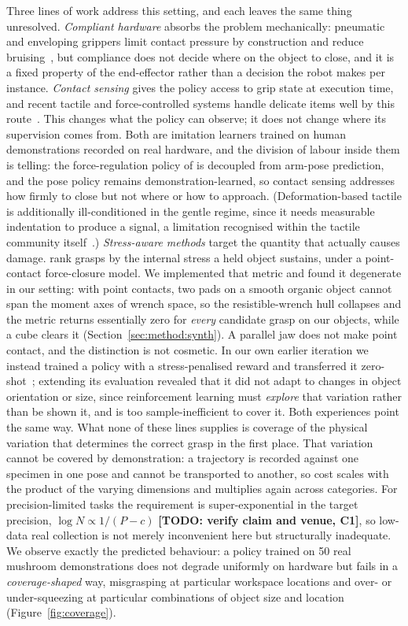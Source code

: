 Three lines of work address this setting, and each leaves the same thing unresolved.
\emph{Compliant hardware} absorbs the problem mechanically: pneumatic and enveloping grippers
limit contact pressure by construction and reduce bruising~\citep{wang2024softgripper}, but
compliance does not decide where on the object to close, and it is a fixed property of the
end-effector rather than a decision the robot makes per instance. \emph{Contact sensing} gives
the policy access to grip state at execution time, and recent tactile and force-controlled
systems handle delicate items well by this route~\citep{tfgripper,vtam}. This changes what the
policy can observe; it does not change where its supervision comes from. Both are imitation
learners trained on human demonstrations recorded on real hardware, and the division of labour
inside them is telling: the force-regulation policy of \citet{tfgripper} is decoupled from
arm-pose prediction, and the pose policy remains demonstration-learned, so contact sensing
addresses how firmly to close but not where or how to approach. (Deformation-based tactile is
additionally ill-conditioned in the gentle regime, since it needs measurable indentation to
produce a signal, a limitation recognised within the tactile community
itself~\citep{lighttact}.) \emph{Stress-aware methods} target the quantity that actually causes
damage. \citet{pan2020stressmin} rank grasps by the internal stress a held object sustains,
under a point-contact force-closure model. We implemented that metric and found it degenerate
in our setting: with point contacts, two pads on a smooth organic object cannot span the
moment axes of wrench space, so the resistible-wrench hull collapses and the metric returns
essentially zero for \emph{every} candidate grasp on our objects, while a cube clears it
(Section~\ref{sec:method:synth}). A parallel jaw does not make point contact, and the
distinction is not cosmetic. In our own earlier iteration we instead trained a policy with a
stress-penalised reward and transferred it zero-shot~\citep{ikemura2025stressrl}; extending
its evaluation revealed that it did not adapt to changes in object orientation or size, since
reinforcement learning must \emph{explore} that variation rather than be shown it, and is too
sample-inefficient to cover it. Both experiences point the same way. What none of these lines
supplies is coverage of the physical variation that determines the correct grasp in the first
place. That variation cannot be covered by
demonstration: a trajectory is recorded against one specimen in one pose and cannot be
transported to another, so cost scales with the product of the varying dimensions and
multiplies again across categories. For precision-limited tasks the requirement is
super-exponential in the target precision, $\log N \propto 1/(P-c)$
\citep{curseofprecision} \textbf{[TODO: verify claim and venue, C1]}, so low-data real
collection is not merely inconvenient here but structurally inadequate. We observe exactly the
predicted behaviour: a policy trained on 50 real mushroom demonstrations does not degrade
uniformly on hardware but fails in a \emph{coverage-shaped} way, misgrasping at particular
workspace locations and over- or under-squeezing at particular combinations of object size and
location (Figure~\ref{fig:coverage}).

